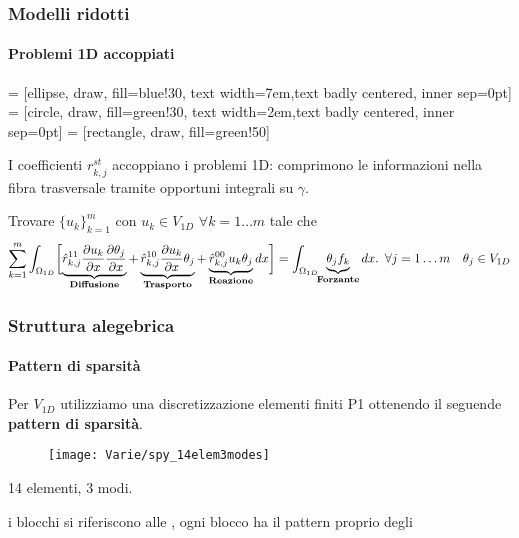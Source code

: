  \begin{frame}
  \frametitle{Modelli ridotti}
  \framesubtitle{Problemi 1D accoppiati}
 \begin{center}
   = [ellipse, draw, fill=blue!30, 
    text width=7em,text badly centered, inner sep=0pt]
   = [circle, draw, fill=green!30, 
    text width=2em,text badly centered, inner sep=0pt]
    = [rectangle, draw, fill=green!50]
 \end{center}
  I coefficienti $r^{st}_{k,j}$ accoppiano i problemi 1D: comprimono le informazioni nella fibra trasversale 
  tramite opportuni integrali su $\gamma$.
 \begin{exampleblock}{}
Trovare $\{u_k\}_{k=1}^m$ con $u_k\in V_{1D}\,\,\forall k=1\ldots m$ tale che
  {\footnotesize
\begin{equation}
\label{eq:modalreducedcoeff}
 \sum_{k=1}^m\int_{\Omega_{1D}}
 \biggl[
 \underbrace{\hat r^{11}_{k,j}\dpar{ u_k}{x}\dpar{\theta_j}{x}}_{\textbf{Diffusione}}
+\underbrace{\hat r^{10}_{k,j}\dpar{ u_k}{x}\theta_j}_{\textbf{Trasporto}}
+\underbrace{\hat r^{00}_{k,j} u_k\theta_j}_{\textbf{Reazione}}
dx\biggr]=\int_{\Omega_{1D}}\nsp{2}\underbrace{\theta_jf_k}_{\textbf{Forzante}} dx. \psp{3}\forall j=1\ldots m\quad\theta_j\in V_{1D} 
\end{equation}}
\end{exampleblock}
 \end{frame}
 \begin{frame}
  \frametitle{Struttura alegebrica}
  \framesubtitle{Pattern di sparsit\`a}
  Per $V_{1D}$ utilizziamo una discretizzazione elementi finiti P1 ottenendo il seguende 
  \textbf{pattern di 
  sparsit\`a}.
  
  \begin{figure}
   \centering
  \texttt{[image: Varie/spy\_14elem3modes]}
 
  \end{figure}
  \begin{center} 14 elementi, 3 modi.\end{center}
  
  \textbf{} i blocchi si riferiscono alle , ogni blocco ha il pattern proprio degli 
 \end{frame}

